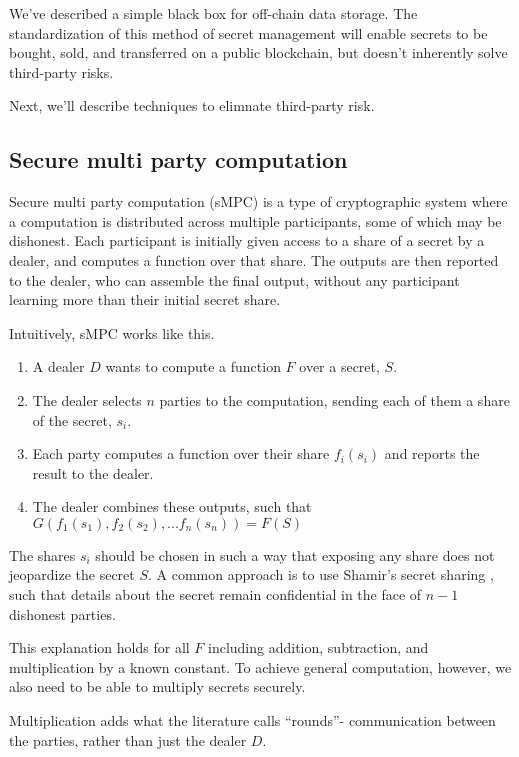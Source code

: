 \documentclass[11pt]{article}
\begin{document}
We've described a simple black box for off-chain data storage. The
standardization of this method of secret management will enable
secrets to be bought, sold, and transferred on a public blockchain,
but doesn't inherently solve third-party risks.

Next, we'll describe techniques to elimnate third-party risk.

\subsection{Secure multi party computation}

Secure multi party computation (sMPC) is a type of cryptographic
system where a computation is distributed across multiple
participants, some of which may be dishonest. Each participant is
initially given access to a share of a secret by a dealer, and
computes a function over that share. The outputs are then reported to
the dealer, who can assemble the final output, without any participant
learning more than their initial secret share.

Intuitively, sMPC works like this.

\begin{enumerate}
  \item A dealer $D$ wants to compute a function $F$ over a secret,
      $S$.
  \item The dealer selects $n$ parties to the computation, sending
      each of them a share of the secret, $s_i$.
  \item Each party computes a function over their share $f_i(s_i)$ and
      reports the result to the dealer.
  \item The dealer combines these outputs, such that
      $G(f_1(s_1),f_2(s_2),...f_n(s_n)) = F(S)$
\end{enumerate}

The shares $s_i$ should be chosen in such a way that exposing any
share does not jeopardize the secret $S$. A common approach is to use
Shamir's secret sharing \cite{shamir}, such that details about the
secret remain confidential in the face of $n-1$ dishonest parties.

This explanation holds for all $F$ including addition, subtraction,
and multiplication by a known constant. To achieve general
computation, however, we also need to be able to multiply secrets
securely.

Multiplication adds what the literature calls ``rounds''- communication
between the parties, rather than just the dealer $D$.
\end{document}
